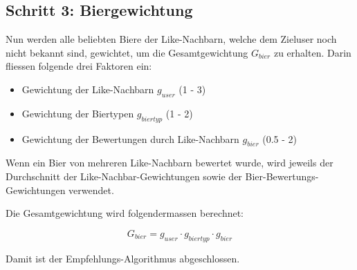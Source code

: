 \documentclass[10pt,a4paper]{scrartcl}
\begin{document}
\subsection{Schritt 3: Biergewichtung}

Nun werden alle beliebten Biere der Like-Nachbarn, welche dem Zieluser noch nicht bekannt sind,
gewichtet, um die Gesamtgewichtung $G_{bier}$ zu erhalten. Darin fliessen folgende drei Faktoren
ein:

\begin{itemize}
	\item Gewichtung der Like-Nachbarn $g_{user}$ (1 - 3)
	\item Gewichtung der Biertypen $g_{biertyp}$ (1 - 2)
	\item Gewichtung der Bewertungen durch Like-Nachbarn $g_{bier}$ (0.5 - 2)
\end{itemize}

Wenn ein Bier von mehreren Like-Nachbarn bewertet wurde, wird jeweils der Durchschnitt der
Like-Nachbar-Gewichtungen sowie der Bier-Bewertungs-Gewichtungen verwendet.

Die Gesamtgewichtung wird folgendermassen berechnet:

$$G_{bier} = g_{user} \cdot g_{biertyp} \cdot g_{bier}$$

Damit ist der Empfehlungs-Algorithmus abgeschlossen.
\end{document}

